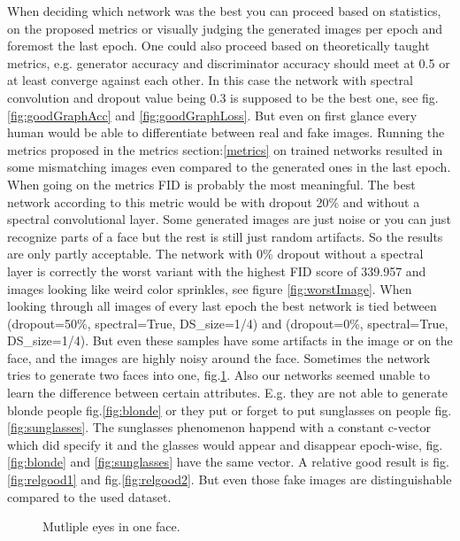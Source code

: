 \documentclass[12pt, a4paper]{article}
\begin{document}
When deciding which network was the best you can proceed based on statistics, on the proposed metrics or visually judging the generated images per epoch and foremost the last epoch.
One could also proceed based on theoretically taught metrics, e.g. generator accuracy and discriminator accuracy should meet at 0.5 or at least converge against each other. In this case the network with spectral convolution and dropout 
value being 0.3 is supposed to be the best one, see fig.\ref{fig:goodGraphAcc} and \ref{fig:goodGraphLoss}. But even on first glance every human would be able to differentiate between real and fake images.
Running the metrics proposed in the metrics section:\ref{metrics} on trained networks resulted in some mismatching images even compared to the generated ones in the last epoch. When going on the metrics FID is probably the most meaningful. The best network according to this metric would be with dropout 20\% and without a spectral convolutional layer. Some generated images are just noise or you can just recognize parts of a face but the rest is still just random artifacts. So the results are only partly acceptable. The network with 0\% dropout without a spectral layer is correctly the worst variant with the highest FID score of 339.957 and images looking like weird color sprinkles, see figure \ref{fig:worstImage}.
When looking through all images of every last epoch the best network is tied between (dropout=50\%, spectral=True, DS\_size=1/4) and (dropout=0\%, spectral=True, DS\_size=1/4). But even these samples have some artifacts in the image or on the face, and the images are highly noisy around the face.
Sometimes the network tries to generate two faces into one, fig.\ref{fig:twoFacesInOne}. 
Also our networks seemed unable to learn the difference between certain attributes. 
E.g. they are not able to generate blonde people fig.\ref{fig:blonde} or they put or forget to put sunglasses on people fig.\ref{fig:sunglasses}. The sunglasses phenomenon happend with a constant c-vector which did specify it and the glasses would appear and disappear epoch-wise, fig.\ref{fig:blonde} and \ref{fig:sunglasses} have the same vector.
A relative good result is fig.\ref{fig:relgood1} and fig.\ref{fig:relgood2}. But even those fake images are distinguishable compared to the used dataset.
\begin{figure}
    \caption{Mutliple eyes in one face.}
    \label{fig:twoFacesInOne}
\end{figure}
\end{document}

